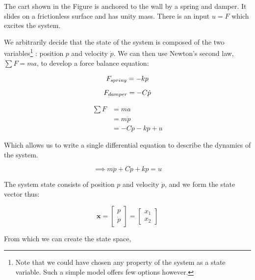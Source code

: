 The cart shown in the Figure is anchored
to the wall by a spring and damper. It slides on a frictionless surface and has
unity mass. There is an input $u = F$ which excites the system.

We arbitrarily decide that the state of the system is composed of the two
variables\footnote{Note that we could have chosen any property of the system
as a state variable. Such a simple model offers few options however.}
: position $p$ and velocity $\dot{p}$. We can then use Newton's second law,
$\sum{F} = ma$,
to develop a force balance equation:

\begin{displaymath}
F_{spring} = -kp \\
\end{displaymath}
\begin{displaymath}
F_{damper} = -C\dot{p} \\\\
\end{displaymath}

\begin{align*}
\sum{F} &= ma \\ &= m\ddot{p} \\
&= -C\dot{p} -kp + u
\end{align*}

Which allows us to write a single differential equation to describe the dynamics
of the system.

\begin{equation}
\implies m\ddot{p} + C\dot{p} + kp = u
\end{equation}

The system state consists of position $p$ and velocity $\dot{p}$, and we form
the state vector thus:

\begin{equation}
    \mathbf{x} =
    \begin{bmatrix}
        p \\
        \dot{p}
    \end{bmatrix}
    =
    \begin{bmatrix}
        x_{1} \\
        x_{2}
    \end{bmatrix}
\end{equation}

From which we can create the state space,

